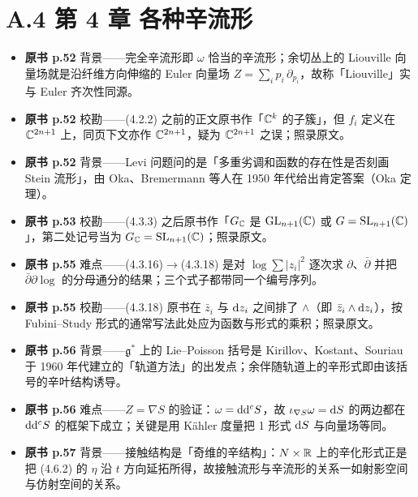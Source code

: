 \section*{A.4 第 4 章 各种辛流形}
\begin{itemize}[leftmargin=2.4em,itemsep=4pt,label={\textbullet}]
\item \textbf{原书 p.52} 背景——完全辛流形即 $\omega$ 恰当的辛流形；余切丛上的 Liouville 向量场就是沿纤维方向伸缩的 Euler 向量场 $Z=\sum_i p_i\,\partial_{p_i}$，故称「Liouville」实与 Euler 齐次性同源。
\item \textbf{原书 p.52} 校勘——(4.2.2) 之前的正文原书作「$\mathbb{C}^k$ 的子簇」，但 $f_i$ 定义在 $\mathbb{C}^{2n+1}$ 上，同页下文亦作 $\mathbb{C}^{2n+1}$，疑为 $\mathbb{C}^{2n+1}$ 之误；照录原文。
\item \textbf{原书 p.52} 背景——Levi 问题问的是「多重劣调和函数的存在性是否刻画 Stein 流形」，由 Oka、Bremermann 等人在 1950 年代给出肯定答案（Oka 定理）。
\item \textbf{原书 p.53} 校勘——(4.3.3) 之后原书作「$G_{\mathbb{C}}$ 是 $\operatorname{GL}_{n+1}(\mathbb{C})$ 或 $G=\operatorname{SL}_{n+1}(\mathbb{C})$」，第二处记号当为 $G_{\mathbb{C}}=\operatorname{SL}_{n+1}(\mathbb{C})$；照录原文。
\item \textbf{原书 p.55} 难点——(4.3.16)$\to$(4.3.18) 是对 $\log\sum|z_i|^2$ 逐次求 $\partial$、$\bar\partial$ 并把 $\bar\partial\partial\log$ 的分母通分的结果；三个式子都带同一个编号序列。
\item \textbf{原书 p.55} 校勘——(4.3.18) 原书在 $\bar z_i$ 与 $\mathrm{d} z_i$ 之间排了 $\wedge$（即 $\bar z_i\wedge\mathrm{d} z_i$），按 Fubini--Study 形式的通常写法此处应为函数与形式的乘积；照录原文。
\item \textbf{原书 p.56} 背景——$\mathfrak{g}^*$ 上的 Lie–Poisson 括号是 Kirillov、Kostant、Souriau 于 1960 年代建立的「轨道方法」的出发点；余伴随轨道上的辛形式即由该括号的辛叶结构诱导。
\item \textbf{原书 p.56} 难点——$Z=\nabla S$ 的验证：$\omega=\mathrm{d}\mathrm{d}^cS$，故 $\iota_{\nabla S}\omega = \mathrm{d} S$ 的两边都在 $\mathrm{d}\mathrm{d}^cS$ 的框架下成立；关键是用 Kähler 度量把 1 形式 $\mathrm{d} S$ 与向量场等同。
\item \textbf{原书 p.57} 背景——接触结构是「奇维的辛结构」：$N\times\mathbb{R}$ 上的辛化形式正是把 (4.6.2) 的 $\eta$ 沿 $t$ 方向延拓所得，故接触流形与辛流形的关系一如射影空间与仿射空间的关系。
\end{itemize}

